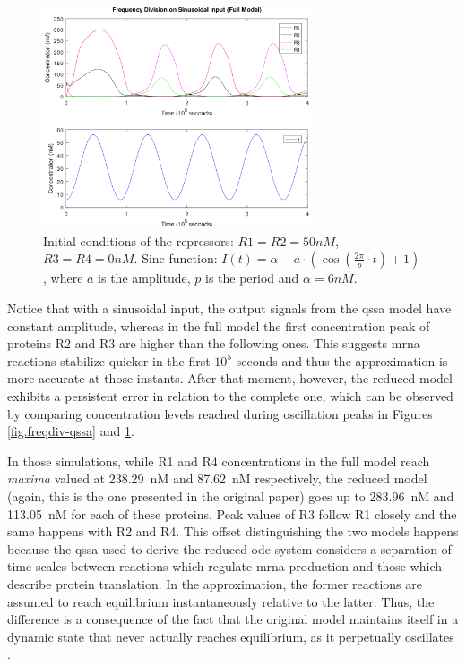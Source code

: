     \begin{figure}[!htbp]
      \centering
      \includegraphics[width=0.7\textwidth]{img/freqdiv-full-1.png}
      \caption{Initial conditions of the repressors: $R1 = R2 = 50nM$, $R3 = R4 = 0nM$. Sine function: $I(t) = \alpha - a\cdot(\cos(\frac{2\pi}{p}\cdot t) + 1)$, where $a$ is the amplitude, $p$ is the period and $\alpha = 6nM$.}
      \label{fig.freqdiv-full}
    \end{figure}

    Notice that with a sinusoidal input, the output signals from the \ac{qssa} model have constant amplitude, whereas in the full model the first concentration peak of proteins R2 and R3 are higher than the following ones.
    This suggests \acs{mrna} reactions stabilize quicker in the first $10^5$ seconds and thus the approximation is more accurate at those instants.
    After that moment, however, the reduced model exhibits a persistent error in relation to the complete one, which can be observed by comparing concentration levels reached during oscillation peaks in Figures \ref{fig.freqdiv-qssa} and \ref{fig.freqdiv-full}.

    In those simulations, while R1 and R4 concentrations in the full model reach \textit{maxima} valued at \SI{238.29}{\nano M} and \SI{87.62}{\nano M} respectively, the reduced model (again, this is the one presented in the original paper) goes up to \SI{283.96}{\nano M} and \SI{113.05}{\nano M} for each of these proteins.
    Peak values of R3 follow R1 closely and the same happens with R2 and R4.
    This offset distinguishing the two models happens because the \ac{qssa} used to derive the reduced \ac{ode} system considers a separation of time-scales between reactions which regulate \acs{mrna} production and those which describe protein translation.
    In the approximation, the former reactions are assumed to reach equilibrium instantaneously relative to the latter.
    Thus, the difference is a consequence of the fact that the original model maintains itself in a dynamic state that never actually reaches equilibrium, as it perpetually oscillates \cite{ingalls}.

